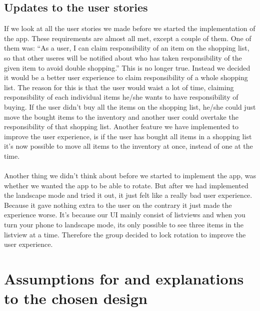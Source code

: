 \documentclass[12pt]{article}
\begin{document}
\subsection{Updates to the user stories}
If we look at all the user stories we made before we started the implementation of the app. These requirements are almost all met, except a couple of them. One of them was: “As a user, I can claim responsibility of an item on the shopping list, so that other useres will be notified about who has taken responsibility of the given item to avoid double shopping.” This is no longer true. Instead we decided it would be a better user experience to claim responsibility of a whole shopping list. The reason for this is that the user would waist a lot of time, claiming responsibility of each individual items he/she wants to have responsibility of buying. If the user didn’t buy all the items on the shopping list, he/she could just move the bought items to the inventory and another user could overtake the responsibility of that shopping list. 
Another feature we have implemented to improve the user experience, is if the user has bought all items in a shopping list it’s now possible to move all items to the inventory at once, instead of one at the time.  
\\
\\
Another thing we didn’t think about before we started to implement the app, was whether we wanted the app to be able to rotate. But after we had implemented the landscape mode and tried it out, it just felt like a really bad user experience. Because it gave nothing extra to the user on the contrary it just made the experience worse. It’s because our UI mainly consist of listviews and when you  turn your phone to landscape mode, its only possible to see three items in the listview at a time. Therefore the group decided to lock rotation to improve the user experience.


\section{Assumptions for and explanations to the chosen design}
\end{document}
